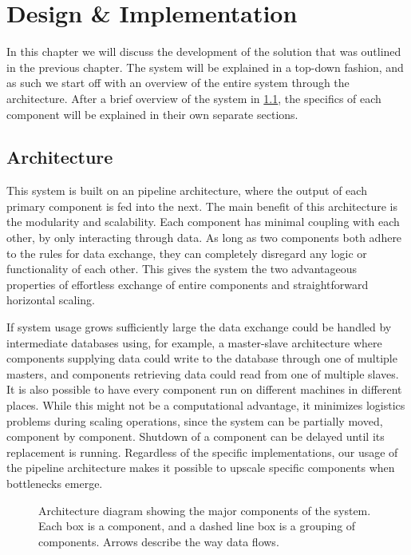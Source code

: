 \chapter{Design \& Implementation}\label{chap:design}
In this chapter we will discuss the development of the solution that was outlined in the previous chapter. The system will be explained in a top-down fashion, and as such we start off with an overview of the entire system through the architecture. After a brief overview of the system in \cref{sec:design_overview}, the specifics of each component will be explained in their own separate sections.

\section{Architecture}\label{sec:design_overview}
This system is built on an pipeline architecture, where the output of each primary component is fed into the next. The main benefit of this architecture is the modularity and scalability. Each component has minimal coupling with each other, by only interacting through data. As long as two components both adhere to the rules for data exchange, they can completely disregard any logic or functionality of each other. This gives the system the two advantageous properties of effortless exchange of entire components and straightforward horizontal scaling.

If system usage grows sufficiently large the data exchange could be handled by intermediate databases using, for example, a master-slave architecture where components supplying data could write to the database through one of multiple masters, and components retrieving data could read from one of multiple slaves. It is also possible to have every component run on different machines in different places. While this might not be a computational advantage, it minimizes logistics problems during scaling operations, since the system can be partially moved, component by component. Shutdown of a component can be delayed until its replacement is running. Regardless of the specific implementations, our usage of the pipeline architecture makes it possible to upscale specific components when bottlenecks emerge.

\begin{figure}[tb]%
  \centering
  
\caption[Architecture diagram showing the major components of the system]{Architecture diagram showing the major components of the system. Each box is a component, and a dashed line box is a grouping of components. Arrows describe the way data flows.}%
\label{fig:system-overview}%
\end{figure}

